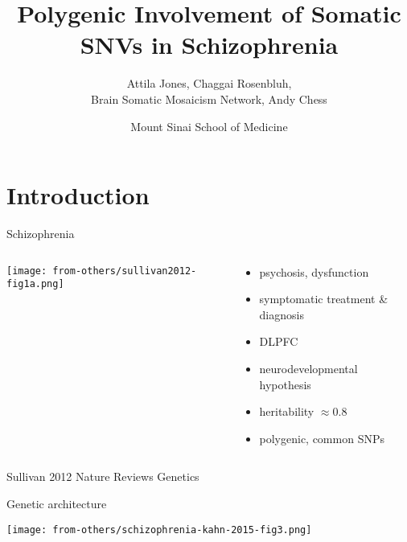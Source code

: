 \documentclass[usenames,dvipsnames]{beamer}
\title{Polygenic Involvement of Somatic SNVs in Schizophrenia}
\author{Attila Jones, Chaggai Rosenbluh,\\Brain Somatic Mosaicism Network, Andy Chess}
\date{Mount Sinai School of Medicine}
\begin{document}
\maketitle

\section{Introduction}

\begin{frame}{Schizophrenia}
\begin{columns}[t]
\begin{column}{0.4\textwidth}

\texttt{[image: from-others/sullivan2012-fig1a.png]}
\end{column}

\begin{column}{0.6\textwidth}
\begin{itemize}
\item psychosis, dysfunction
\item symptomatic treatment \& diagnosis
\item DLPFC
\item neurodevelopmental hypothesis
\item heritability \(\approx 0.8\)
\item polygenic, common SNPs
\end{itemize}
\end{column}
\end{columns}

{\tiny Sullivan 2012 Nature Reviews Genetics}
\end{frame}

\begin{frame}{Genetic architecture}
\begin{center}
\texttt{[image: from-others/schizophrenia-kahn-2015-fig3.png]}
\end{center}
\end{frame}
\end{document}
